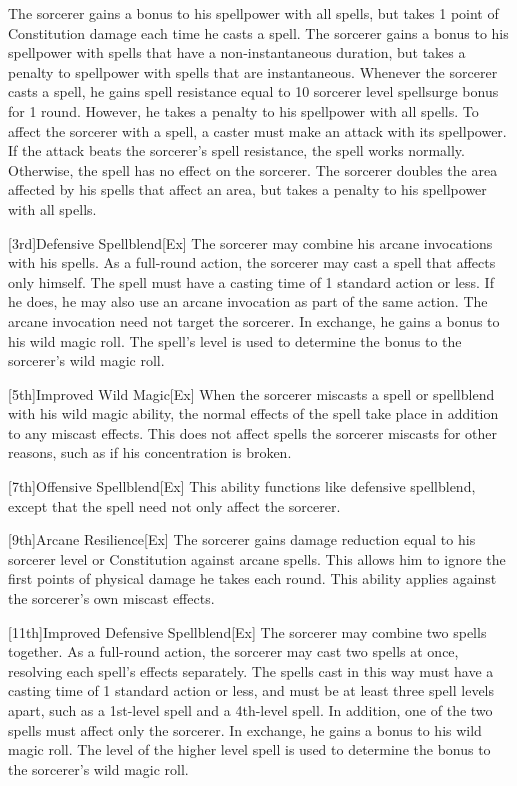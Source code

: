 The sorcerer gains a bonus to his spellpower with all spells, but takes 1 point of Constitution damage each time he casts a spell.
The sorcerer gains a bonus to his spellpower with spells that have a non-instantaneous duration, but takes a penalty to spellpower with spells that are instantaneous.
Whenever the sorcerer casts a spell, he gains spell resistance equal to 10 \add sorcerer level \add spellsurge bonus for 1 round.
However, he takes a penalty to his spellpower with all spells.
To affect the sorcerer with a spell, a caster must make an attack with its spellpower.
If the attack beats the sorcerer's spell resistance, the spell works normally.
Otherwise, the spell has no effect on the sorcerer.
The sorcerer doubles the area affected by his spells that affect an area, but takes a penalty to his spellpower with all spells.

[3rd]{Defensive Spellblend}[Ex]
The sorcerer may combine his arcane invocations with his spells.
As a full-round action, the sorcerer may cast a spell that affects only himself.
The spell must have a casting time of 1 standard action or less.
If he does, he may also use an arcane invocation as part of the same action.
The arcane invocation need not target the sorcerer.
In exchange, he gains a  bonus to his wild magic roll.
The spell's level is used to determine the bonus to the sorcerer's wild magic roll.

[5th]{Improved Wild Magic}[Ex]
When the sorcerer miscasts a spell or spellblend with his wild magic ability, the normal effects of the spell take place in addition to any miscast effects.
This does not affect spells the sorcerer miscasts for other reasons, such as if his concentration is broken.

[7th]{Offensive Spellblend}[Ex]
This ability functions like defensive spellblend, except that the spell need not only affect the sorcerer.

[9th]{Arcane Resilience}[Ex]
The sorcerer gains damage reduction equal to his sorcerer level or Constitution against arcane spells.
This allows him to ignore the first points of physical damage he takes each round.
This ability applies against the sorcerer's own miscast effects.

[11th]{Improved Defensive Spellblend}[Ex]
The sorcerer may combine two spells together.
As a full-round action, the sorcerer may cast two spells at once, resolving each spell's effects separately.
The spells cast in this way must have a casting time of 1 standard action or less, and must be at least three spell levels apart, such as a 1st-level spell and a 4th-level spell.
In addition, one of the two spells must affect only the sorcerer.
In exchange, he gains a  bonus to his wild magic roll.
The level of the higher level spell is used to determine the bonus to the sorcerer's wild magic roll.


